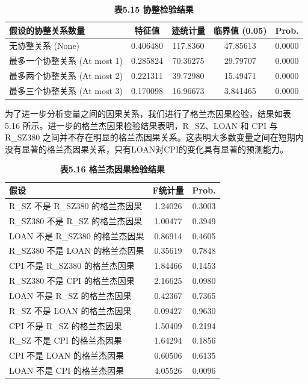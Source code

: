 \documentclass[12pt, a4paper]{article}
\numberwithin{equation}{section}
\begin{document}
\begin{table}[h!]
    \centering
    \captionsetup{labelformat=empty}
    \caption{\textbf{\fontsize{9pt}{11pt}\selectfont 表5.15 协整检验结果}}
    \begin{tabular}{lcccc}
        \toprule
        假设的协整关系数量            & 特征值      & 迹统计量     & 临界值 (0.05) & Prob.  \\
        \midrule
        无协整关系 (None)         & 0.406480 & 117.8360 & 47.85613   & 0.0000 \\
        最多一个协整关系 (At most 1) & 0.285824 & 70.36275 & 29.79707   & 0.0000 \\
        最多两个协整关系 (At most 2) & 0.221311 & 39.72980 & 15.49471   & 0.0000 \\
        最多三个协整关系 (At most 3) & 0.170098 & 16.96673 & 3.841465   & 0.0000 \\
        \bottomrule
    \end{tabular}
\end{table}

为了进一步分析变量之间的因果关系，我们进行了格兰杰因果检验，结果如表 5.16 所示。进一步的格兰杰因果检验结果表明，R\_SZ、LOAN 和 CPI 与 R\_SZ380 之间并不存在明显的格兰杰因果关系。这表明大多数变量之间在短期内没有显著的格兰杰因果关系，只有LOAN对CPI的变化具有显著的预测能力。

\begin{table}[h!]
    \centering
    \captionsetup{labelformat=empty}
    \caption{\textbf{\fontsize{9pt}{11pt}\selectfont 表5.16 格兰杰因果检验结果}}
    \begin{tabular}{lcc}
        \toprule
        假设                       & F统计量    & Prob.  \\
        \midrule
        R\_SZ 不是 R\_SZ380 的格兰杰因果 & 1.24026 & 0.3003 \\
        R\_SZ380 不是 R\_SZ 的格兰杰因果 & 1.00477 & 0.3949 \\
        LOAN 不是 R\_SZ380 的格兰杰因果  & 0.86914 & 0.4605 \\
        R\_SZ380 不是 LOAN 的格兰杰因果  & 0.35619 & 0.7848 \\
        CPI 不是 R\_SZ380 的格兰杰因果   & 1.84466 & 0.1453 \\
        R\_SZ380 不是 CPI 的格兰杰因果   & 2.16625 & 0.0980 \\
        LOAN 不是 R\_SZ 的格兰杰因果     & 0.42367 & 0.7365 \\
        R\_SZ 不是 LOAN 的格兰杰因果     & 0.09427 & 0.9630 \\
        CPI 不是 R\_SZ 的格兰杰因果      & 1.50409 & 0.2194 \\
        R\_SZ 不是 CPI 的格兰杰因果      & 1.64294 & 0.1856 \\
        CPI 不是 LOAN 的格兰杰因果       & 0.60506 & 0.6135 \\
        LOAN 不是 CPI 的格兰杰因果       & 4.05526 & 0.0096 \\
        \bottomrule
    \end{tabular}
\end{table}
\end{document}
